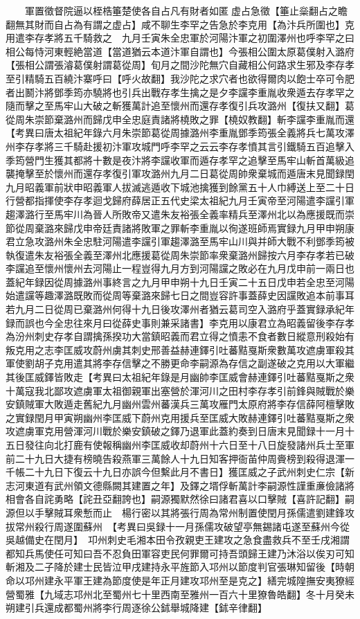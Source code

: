 　　軍置徵督院逼以桎梏箠楚使各自占凡有財者如匿虚占急徵【箠止橤翻占之瞻翻無其財而自占為有謂之虚占】咸不聊生李罕之告急於李克用【為汴兵所圍也】克用遣李存孝將五千騎救之　九月壬寅朱全忠軍於河陽汴軍之初圍澤州也呼李罕之曰相公每恃河東輕絶當道【當道猶云本道汴軍自謂也】今張相公圍太原葛僕射入潞府【張相公謂張濬葛僕射謂葛從周】旬月之間沙陀無穴自藏相公何路求生邪及李存孝至引精騎五百繞汴寨呼曰【呼火故翻】我沙陀之求穴者也欲得爾肉以飽士卒可令肥者出鬭汴將鄧季筠亦驍將也引兵出戰存孝生擒之是夕李讜李重胤收衆遁去存孝罕之隨而擊之至馬牢山大破之斬獲萬計追至懷州而還存孝復引兵攻潞州【復扶又翻】葛從周朱崇節棄潞州而歸戊申全忠庭責諸將橈敗之罪【橈奴教翻】斬李讜李重胤而還　【考異曰唐太祖紀年錄六月朱崇節葛從周據潞州李重胤鄧季筠張全義將兵七萬攻澤州李存孝將三千騎赴援初汴軍攻城門呼李罕之云云李存孝憤其言引鐵騎五百追擊入季筠營門生獲其都將十數是夜汴將李讜收軍而遁存孝罕之追擊至馬牢山斬首萬級追襲掩擊至於懷州而還存孝復引軍攻潞州九月二日葛從周帥衆棄城而遁唐末見聞録閏九月昭義軍前狀申昭義軍人拔滅逃遁收下城池擒獲到餘黨五十人巾縛送上至二十日行營都指揮使李存孝迴戈歸府薛居正五代史梁太祖紀九月壬寅帝至河陽遣李讜引軍趨澤潞行至馬牢川為晉人所敗帝又遣朱友裕張全義率精兵至澤州北以為應援既而崇節從周棄潞來歸戊申帝廷責諸將敗軍之罪斬李重胤以徇遂班師焉實録九月甲申朔康君立急攻潞州朱全忠駐河陽遣李讜引軍趨澤潞至馬牢山川與并師大戰不利鄧季筠被執復遣朱友裕張全義至澤州北應援葛從周朱崇節率衆棄潞州歸按六月李存孝若已破李讜追至懷州懷州去河陽止一程豈得九月方到河陽讜之敗必在九月戊申前一兩日也蓋紀年録因從周據潞州事終言之九月甲申朔十九日壬寅二十五日戊申若全忠至河陽始遣讜等趣澤潞既敗而從周等棄潞來歸七日之間豈容許事蓋薛史因讜敗追本前事耳若九月二日從周已棄潞州何得十九日後攻澤州者猶云葛司空入潞府乎蓋實録承紀年録而誤也今全忠往來月曰從薛史事則兼采諸書】李克用以康君立為昭義留後李存孝為汾州刺史存孝自謂擒孫揆功大當鎮昭義而君立得之憤恚不食者數日縱意刑殺始有叛克用之志李匡威攻蔚州虜其刺史邢善益赫連鐸引吐蕃黠戛斯衆數萬攻遮虜軍殺其軍使劉胡子克用遣其將李存信擊之不勝更命李嗣源為存信之副遂破之克用以大軍繼其後匡威鐸皆敗走【考異曰太祖紀年錄是月幽帥李匡威會赫連鐸引吐蕃黠戛斯之衆十萬寇我北鄙攻遮虜軍太祖御親軍出塞營於渾河川之田村李存孝引前鋒與賊戰於樂安鎮賊軍大敗遁走舊紀九月幽州雲州蕃漢兵三萬攻雁門太原府將李存信薛阿檀擊敗之實録閏月甲寅朔幽州李匡威下蔚州克用援兵至匡威大敗赫連鐸引吐蕃黠戛斯之衆攻遮虜軍克用營渾河川戰於樂安鎮破之鐸乃退軍此蓋約奏到日唐末見聞録十一月十五日發往向北打鹿有使報稱幽州李匡威收却蔚州十六日至十八日旋發諸州兵士至軍前二十九日大捷有榜曉告殺燕軍三萬餘人十九日知客押衙苖仲周賫榜到殺得退渾一千帳二十九日下復云十九日亦誤今但繫此月不書日】獲匡威之子武州刺史仁宗【新志河東道有武州領文德縣闕其建置之年】及鐸之壻俘斬萬計李嗣源性謹重亷儉諸將相會各自詫勇略【詫丑亞翻誇也】嗣源獨默然徐曰諸君喜以口擊賊【喜許記翻】嗣源但以手擊賊耳衆慙而止　楊行密以其將張行周為常州制置使閏月孫儒遣劉建鋒攻拔常州殺行周遂圍蘇州　【考異曰吳録十一月孫儒攻破望亭無錫諸屯遂至蘇州今從吳越備史在閏月】　卭州刺史毛湘本田令孜親吏王建攻之急食盡救兵不至壬戌湘謂都知兵馬使任可知曰吾不忍負田軍容吏民何罪爾可持吾頭歸王建乃沐浴以俟刃可知斬湘及二子降於建士民皆泣甲戌建持永平旌節入邛州以節度判官張琳知留後【時朝命以邛州建永平軍王建為節度使是年正月建攻邛州至是克之】繕完城隍撫安夷獠經營蜀雅【九域志邛州北至蜀州七十里西南至雅州一百六十里獠魯皓翻】冬十月癸未朔建引兵還成都蜀州將李行周逐徐公鉥舉城降建【鉥辛律翻】